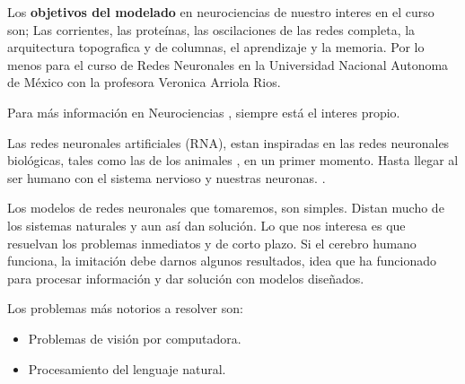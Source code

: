 Los \textbf{objetivos del modelado} en neurociencias de nuestro interes en el curso son; Las corrientes, las proteínas, las oscilaciones de las redes completa, la arquitectura topografica y de columnas, el aprendizaje y la memoria. Por lo menos para el curso de Redes Neuronales en la Universidad Nacional Autonoma de México con la profesora Veronica Arriola Rios.

Para más información en Neurociencias \cite{princNS5}, siempre está el interes propio.

Las redes neuronales artificiales (RNA), estan inspiradas en las redes neuronales biológicas, tales como las de los animales \cite{incipiencias}, en un primer momento. Hasta llegar al ser humano con el sistema nervioso y nuestras neuronas. \cite{ideaNeurona}. 

Los modelos de redes neuronales que tomaremos, son simples. Distan mucho de los sistemas naturales y aun así dan solución. Lo que nos interesa es que resuelvan los problemas inmediatos y de corto plazo. Si el cerebro humano funciona, la imitación debe darnos algunos resultados, idea que ha funcionado para procesar información y dar solución con modelos diseñados. 

Los problemas más notorios a resolver son: 
\begin{itemize}
\item Problemas de visión por computadora.
\item Procesamiento del lenguaje natural.
\end{itemize}
